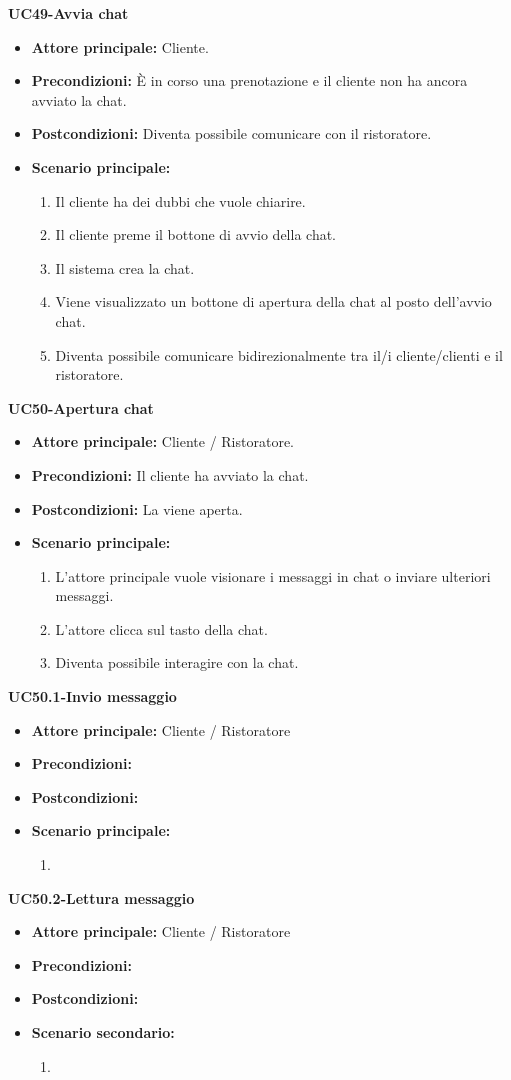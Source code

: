 
\textbf{UC49-Avvia chat}
\begin{itemize}
\item \textbf{Attore principale:} Cliente.
\item \textbf{Precondizioni:} È in corso una prenotazione e il cliente non ha ancora avviato la chat. %
\item \textbf{Postcondizioni:} Diventa possibile comunicare con il ristoratore.
\item \textbf{Scenario principale:}
\begin{enumerate}
    \item Il cliente ha dei dubbi che vuole chiarire.
    \item Il cliente preme il bottone di avvio della chat.
    \item Il sistema crea la chat.
    \item Viene visualizzato un bottone di apertura della chat al posto dell'avvio chat.
    \item Diventa possibile comunicare bidirezionalmente tra il/i cliente/clienti e il ristoratore. 
\end{enumerate}
\end{itemize}

\textbf{UC50-Apertura chat}
\begin{itemize}
\item \textbf{Attore principale:} Cliente / Ristoratore.
\item \textbf{Precondizioni:} Il cliente ha avviato la chat.
\item \textbf{Postcondizioni:} La viene aperta. %
\item \textbf{Scenario principale:}
\begin{enumerate}
    \item L'attore principale vuole visionare i messaggi in chat o inviare ulteriori messaggi.
    \item L'attore clicca sul tasto della chat.
    \item Diventa possibile interagire con la chat.
\end{enumerate}
\end{itemize}

\textbf{UC50.1-Invio messaggio}
\begin{itemize}
\item \textbf{Attore principale:} Cliente / Ristoratore
\item \textbf{Precondizioni:}
\item \textbf{Postcondizioni:}
\item \textbf{Scenario principale:}
\begin{enumerate}
    \item
\end{enumerate}
\end{itemize}

\textbf{UC50.2-Lettura messaggio}
\begin{itemize}
\item \textbf{Attore principale:} Cliente / Ristoratore
\item \textbf{Precondizioni:}
\item \textbf{Postcondizioni:}
\item \textbf{Scenario secondario:}
\begin{enumerate}
    \item
\end{enumerate}
\end{itemize}
